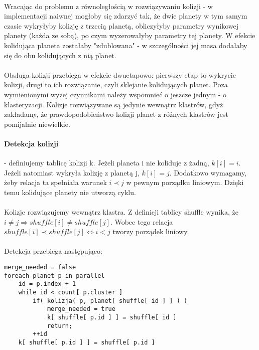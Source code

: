 \paragraph{} Wracając do problemu z równoległością w rozwiązywaniu kolizji - w implementacji naiwnej mogłoby się zdarzyć tak, że dwie planety w tym samym czasie wykryłyby kolizję z trzecią planetą, obliczyłyby parametry wynikowej planety (każda ze sobą), po czym wyzerowałyby parametry tej planety. W efekcie kolidująca planeta zostałaby "zdublowana" - w szczególności jej masa dodałaby się do obu kolidujących z nią planet.

\paragraph{} Obsługa kolizji przebiega w efekcie dwuetapowo: pierwszy etap to wykrycie kolizji, drugi to ich rozwiązanie, czyli sklejanie kolidujących planet. Poza wymienionymi wyżej czynnikami należy wspomnieć o jeszcze jednym - o klasteryzacji. Kolizje rozwiązywane są jedynie wewnątrz klastrów, gdyż zakładamy, że prawdopodobieństwo kolizji planet z różnych klastrów jest pomijalnie niewielkie.

\paragraph{Detekcja kolizji} - definiujemy tablicę kolizji k. Jeżeli planeta i nie koliduje z żadną, \ensuremath{k[i] = i}. Jeżeli natomiast wykryła kolizję z planetą j, \ensuremath{k[i] = j}. Dodatkowo wymagamy, żeby relacja ta spełniała warunek \ensuremath{i\prec j} w pewnym porządku liniowym. Dzięki temu kolidujące planety nie utworzą cyklu.

\paragraph{} Kolizje rozwiązujemy wewnątrz klastra.  Z definicji tablicy shuffle wynika, że \ensuremath{i \neq j \Rightarrow shuffle[i]\neq shuffle[j]}. Wobec tego relacja \ensuremath{shuffle[i] \prec shuffle[j] \Leftrightarrow i<j } tworzy porządek liniowy.

\paragraph{} Detekcja przebiega następująco:
\begin{lstlisting}
merge_needed = false
foreach planet p in parallel
	id = p.index + 1
	while id < count[ p.cluster ]
		if( kolizja( p, planet[ shuffle[ id ] ] ) )
			merge_needed = true
			k[ shuffle[ p.id ] ] = shuffle[ id ]
			return;
		++id
	k[ shuffle[ p.id ] ] = shuffle[ p.id ]
\end{lstlisting}

